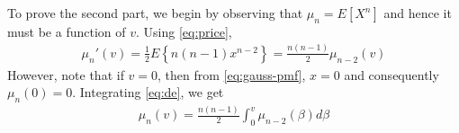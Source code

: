 \documentclass{beamer}
\begin{document}
\begin{frame}
	To prove the second part, we begin by observing that $\mu_n = E[X^n]$ and hence it must be a function of $v$. Using \eqref{eq:price},
	\begin{align}
		\mu_n'(v) = \frac{1}{2}E\left\{n(n - 1)x^{n - 2}\right\} = \frac{n(n - 1)}{2}\mu_{n - 2}{(v)}
		\label{eq:de}
	\end{align}
	However, note that if $v = 0$, then from \eqref{eq:gauss-pmf}, $x = 0$ and consequently $\mu_n(0) = 0$. Integrating \eqref{eq:de}, we get
	\begin{align}
		\mu_n(v) = \frac{n(n - 1)}{2}\int_{0}^{v}\mu_{n - 2}(\beta)d\beta
		\label{eq:sol2}
	\end{align}
\end{frame}
\end{document}
